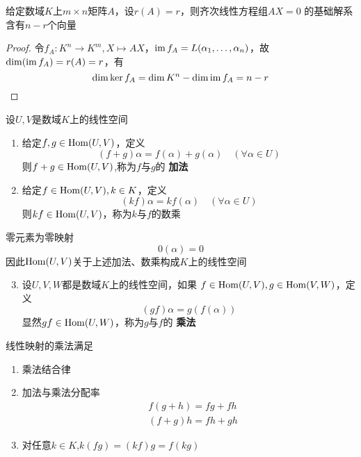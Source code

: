 \documentclass[11pt]{article}
\begin{document}
\begin{corollary}[]
给定数域\(K\)上\(m\times n\)矩阵\(A\)，设\(r(A)=r\)，则齐次线性方程组\(AX=0\)
的基础解系含有\(n-r\)个向量
\end{corollary}

\begin{proof}
令\(f_A:K^n\to K^m,X\mapsto AX\)，\(\operatorname{im} f_A=L(\alpha_1,\dots,\alpha_n)\)，故
\(\dim(\operatorname{im} f_A)=r(A)=r\)，有
\begin{equation*}
\dim\ker f_A=\dim K^n-\dim\operatorname{im} f_A=n-r
\end{equation*}
\end{proof}

设\(U,V\)是数域\(K\)上的线性空间
\begin{enumerate}
\item 给定\(f,g\in\operatorname{Hom}(U,V)\)，定义
\begin{equation*}
(f+g)\alpha=f(\alpha)+g(\alpha)\quad(\forall\alpha\in U)
\end{equation*}
则\(f+g\in\operatorname{Hom}(U,V)\),称为\(f\)与\(g\)的 \textbf{加法}
\item 给定\(f\in\operatorname{Hom}(U,V),k\in K\)，定义
\begin{equation*}
(kf)\alpha=kf(\alpha)\quad(\forall\alpha\in U)
\end{equation*}
则\(kf\in\operatorname{Hom}(U,V)\)，称为\(k\)与\(f\)的数乘
\end{enumerate}


零元素为零映射
  \begin{equation*}
0(\alpha)=0
\end{equation*}
因此\(\operatorname{Hom}(U,V)\)关于上述加法、数乘构成\(K\)上的线性空间
\begin{enumerate}
\setcounter{enumi}{2}
\item 设\(U,V,W\)都是数域\(K\)上的线性空间，如果
\(f\in\operatorname{Hom}(U,V),g\in\operatorname{Hom}(V,W)\)，定义
\begin{equation*}
(gf)\alpha=g(f(\alpha))
\end{equation*}
显然\(gf\in\operatorname{Hom}(U,W)\)，称为\(g\)与\(f\)的 \textbf{乘法}
\end{enumerate}


线性映射的乘法满足
\begin{enumerate}
\item 乘法结合律
\item 加法与乘法分配率
\begin{align*}
&f(g+h)=fg+fh\\
&(f+g)h=fh+gh
\end{align*}
\item 对任意\(k\in K\),\(k(fg)=(kf)g=f(kg)\)
\end{enumerate}
\end{document}
